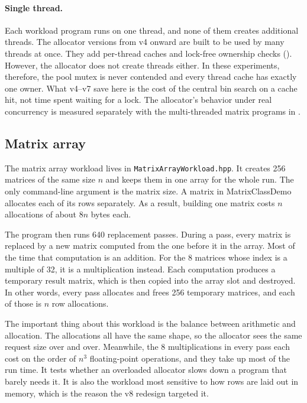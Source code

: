 \paragraph{Single thread.}
Each workload program runs on one thread, and none of them creates additional
threads.
The allocator versions from v4 onward are built to be used by many threads at
once.
They add per-thread caches and lock-free ownership checks
().
However, the allocator does not create threads either.
In these experiments, therefore, the pool mutex is never contended and every
thread cache has exactly one owner.
What v4--v7 save here is the cost of the central bin search on a cache hit,
not time spent waiting for a lock.
The allocator's behavior under real concurrency is measured separately with
the multi-threaded matrix programs in .

\subsection{Matrix array}

The matrix array workload lives in
\texttt{Matrix\allowbreak Array\allowbreak Workload.hpp}.
It creates 256 matrices of the same size $n$ and keeps them in one array for
the whole run.
The only command-line argument is the matrix size.
A matrix in MatrixClassDemo allocates each of its rows separately.
As a result, building one matrix costs $n$ allocations of about $8n$ bytes
each.

The program then runs 640 replacement passes.
During a pass, every matrix is replaced by a new matrix computed from the one
before it in the array.
Most of the time that computation is an addition.
For the 8 matrices whose index is a multiple of 32, it is a multiplication
instead.
Each computation produces a temporary result matrix, which is then copied into
the array slot and destroyed.
In other words, every pass allocates and frees 256 temporary matrices, and each
of those is $n$ row allocations.

The important thing about this workload is the balance between arithmetic and
allocation.
The allocations all have the same shape, so the allocator sees the same request
size over and over.
Meanwhile, the 8 multiplications in every pass each cost on the order of
$n^{3}$ floating-point operations, and they take up most of the run time.
It tests whether an overloaded allocator slows down a program that barely
needs it.
It is also the workload most sensitive to how rows are laid out in memory, which
is the reason the v8 redesign targeted it.

